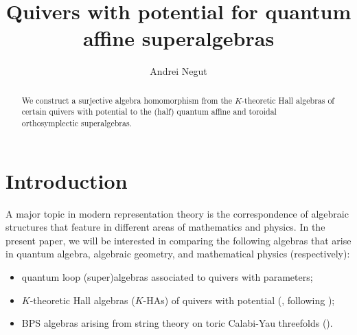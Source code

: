 \documentclass{amsart}
\begin{document}
\title[QUIVERS WITH POTENTIAL FOR QUANTUM AFFINE SUPERALGEBRAS]{\Large{\textbf{Quivers with potential for quantum affine superalgebras}}} 

\author[Andrei Negu\cb t]{Andrei Negu\cb t}

\address{École Polytechnique Fédérale de Lausanne (EPFL), Lausanne, Switzerland \newline \text{ } \ \ Simion Stoilow Institute of Mathematics (IMAR), Bucharest, Romania} 

\def\uppercasenonmath#1{}

\maketitle

\begin{abstract} We construct a surjective algebra homomorphism from the $K$-theoretic Hall algebras of certain quivers with potential to the (half) quantum affine and toroidal orthosymplectic superalgebras.  \end{abstract}


\section{Introduction}
\label{sec:intro}

\medskip 

A major topic in modern representation theory is the correspondence of algebraic structures that feature in different areas of mathematics and physics. In the present paper, we will be interested in comparing the following algebras that arise in quantum algebra, algebraic geometry, and mathematical physics (respectively):

\medskip 

\begin{itemize}[leftmargin=*]
	
\item quantum loop (super)algebras associated to quivers with parameters;

\medskip 

\item $K$-theoretic Hall algebras ($K$-HAs) of quivers with potential (\cite{P}, following \cite{KS});

\medskip 

\item BPS algebras arising from string theory on toric Calabi-Yau threefolds (\cite{HM}).

\end{itemize}
\end{document}
